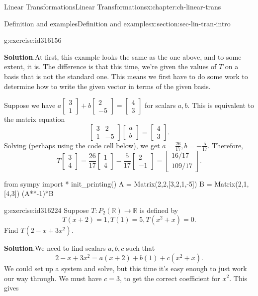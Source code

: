 \documentclass[oneside,10pt,]{book}
\numberwithin{equation}{section}
\newcommand{\bbm}{\begin{bmatrix}}
\newcommand{\ebm}{\end{bmatrix}}
\newcommand{\R}{\mathbb{R}}
\newcommand{\amp}{&}
\begin{document}
\begin{chapterptx}{Linear Transformations}{}{Linear Transformations}{}{}{x:chapter:ch-linear-trans}
\begin{sectionptx}{Definition and examples}{}{Definition and examples}{}{}{x:section:sec-lin-tran-intro}
\begin{inlineexercise}{}{g:exercise:id316156}
\par\smallskip%
\noindent\textbf{Solution}.\hypertarget{g:solution:id316183}{}\quad{}At first, this example looks the same as the one above, and to some extent, it is. The difference is that this time, we're given the values of \(T\) on a basis that is not the standard one. This means we first have to do some work to determine how to write the given vector in terms of the given basis.%
\par
Suppose we have \(a\bbm 3\\1\ebm+b\bbm 2\\-5\ebm = \bbm 4\\3\ebm\) for scalars \(a,b\). This is equivalent to the matrix equation%
\begin{equation*}
\bbm 3\amp 2\\1\amp -5\ebm\bbm a\\b\ebm = \bbm 4\\3\ebm.
\end{equation*}
Solving (perhaps using the code cell below), we get \(a=\frac{26}{17}, b = -\frac{5}{17}\). Therefore,%
\begin{equation*}
T\bbm 3\\4\ebm = \frac{26}{17}\bbm 1\\4\ebm -\frac{5}{17}\bbm 2\\-1\ebm = \bbm 16/17\\109/17\ebm\text{.}
\end{equation*}
%
\end{inlineexercise}
\begin{sageinput}
from sympy import *
init_printing()
A = Matrix(2,2,[3,2,1,-5])
B = Matrix(2,1,[4,3])
(A**-1)*B
\end{sageinput}
\begin{inlineexercise}{}{g:exercise:id316224}%
Suppose \(T:P_2(\R)\to \R\) is defined by%
\begin{equation*}
T(x+2)=1, T(1)=5, T(x^2+x)=0.
\end{equation*}
Find \(T(2-x+3x^2)\).%
\par\smallskip%
\noindent\textbf{Solution}.\hypertarget{g:solution:id316262}{}\quad{}We need to find scalars \(a,b,c\) such that%
\begin{equation*}
2-x+3x^2 = a(x+2)+b(1)+c(x^2+x)\text{.}
\end{equation*}
We could set up a system and solve, but this time it's easy enough to just work our way through. We must have \(c=3\), to get the correct coefficient for \(x^2\). This gives%
\begin{equation*}

\end{equation*}
\end{inlineexercise}
\end{sectionptx}
\end{chapterptx}
\end{document}
